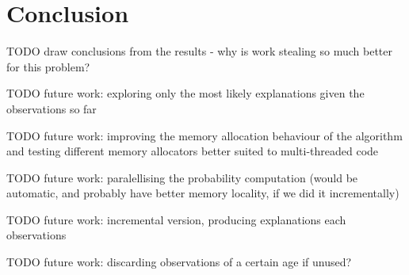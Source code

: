 \chapter{Conclusion}

TODO draw conclusions from the results - why is work stealing so much better for this problem?

TODO future work: exploring only the most likely explanations given the observations so far

TODO future work: improving the memory allocation behaviour of the algorithm and testing different memory allocators better suited to multi-threaded code

TODO future work: paralellising the probability computation (would be automatic, and probably have better memory locality, if we did it incrementally)

TODO future work: incremental version, producing explanations each observations

TODO future work: discarding observations of a certain age if unused?